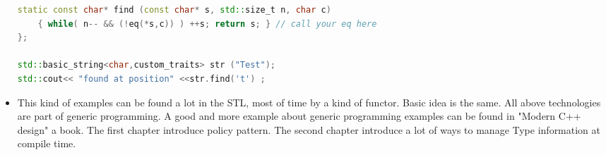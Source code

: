 \documentclass[a4paper,11pt,twoside]{book}
\begin{document}
\begin{itemize}
\begin{lstlisting}[frame=single, language=c++]
static const char* find (const char* s, std::size_t n, char c)
	{ while( n-- && (!eq(*s,c)) ) ++s; return s; } // call your eq here
};
	
std::basic_string<char,custom_traits> str ("Test");
std::cout<< "found at position" <<str.find('t') ;
\end{lstlisting}

	
	\item This kind of examples can be found a lot in the STL, most of time by a kind of functor. Basic idea is the same. All above technologies are part of generic programming. A good and more example about generic programming examples can be found in "Modern C++ design" a book. The first chapter introduce policy pattern. The second chapter introduce a lot of ways to manage Type information at compile time. 
	
\end{itemize}
\end{document}
